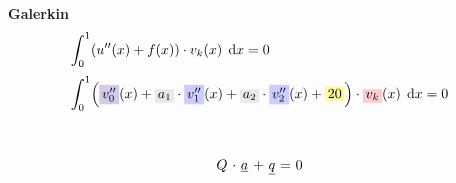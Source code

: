 \documentclass[
final,
a4paper,
oneside,
parskip=full,
headings=standardclasses,
headings=big,
pointednumbers,
fleqn
]{scrartcl}
\newcommand{\tfillb}[1]{\tfillc[#1][blue!20]}
\newcommand{\tfilly}[1]{\tfillc[#1][yellow!40]}
\newcommand{\tfillr}[1]{\tfillc[#1][red!20]}
\newcommand{\tfillv}[1]{\tfillc[#1][Violet!20]}
\newcommand{\tfillgr}[1]{\tfillc[#1][Gray!20]}
\newcommand*\difx{\; \mathop{}\!\mathrm{d}x}
\newcommand{\kl}[1]{{\left( #1 \right)}}
\begin{document}
    
    {\bf{Galerkin}} \\
    {\setlength{\abovedisplayskip}{-6pt}
    \setlength{\belowdisplayskip}{-12pt}
    \begin{align*}
        \int_{0}^{1}&{\kl{u''\kl{x} + f\kl{x}} \cdot v_k\kl{x} \difx} = 0  \\[0.1cm]
        \int_{0}^{1}&{\kl{\tfillv{$v_0''$}\kl{x}   + \tfillgr{$a_1$} \cdot \tfillb{$v_1''$}\kl{x}   + \tfillgr{$a_2$} \cdot \tfillb{$v_2''$}\kl{x} + \tfilly{$20$}} \cdot \tfillr{$v_k$}\kl{x} \difx} = 0  \\[0.1cm]
    \end{align*}} \\
    \begin{comment}
    \begin{bmatrix}
    \int\limits_{0}^{1}{\tfillb{$v_1''$}\kl{x} \cdot \tfillr{$v_1$}\kl{x} \difx} &
    \int\limits_{0}^{1}{\tfillb{$v_2''$}\kl{x} \cdot \tfillr{$v_1$}\kl{x} \difx} \\
    \int\limits_{0}^{1}{\tfillb{$v_1''$}\kl{x} \cdot \tfillr{$v_2$}\kl{x} \difx} & 
    \int\limits_{0}^{1}{\tfillb{$v_2''$}\kl{x} \cdot \tfillr{$v_2$}\kl{x} \difx} \\
    \end{bmatrix} & \cdot &
    \begin{pmatrix}
    a_1 \\
    a_2
    \end{pmatrix} & + & 
    \begin{pmatrix}
    \int\limits_{0}^{1}{\tfillv{$v_0''$}\kl{x} \cdot \tfillr{$v_1$}\kl{x} \difx} + \int\limits_{0}^{1}{\tfilly{$20$}\kl{x} \cdot \tfillr{$v_1$}\kl{x} \difx} \\
    \int\limits_{0}^{1}{\tfillv{$v_0''$}\kl{x} \cdot \tfillr{$v_1$}\kl{x} \difx} + \int\limits_{0}^{1}{\tfilly{$20$}\kl{x} \cdot \tfillr{$v_1$}\kl{x} \difx}
    \end{pmatrix} & = & 0
    \end{comment}
    {\setlength{\abovedisplayskip}{-6pt}
    \setlength{\belowdisplayskip}{-12pt}
    \begin{align*}
        \begin{array}{r@{\ }c@{\ }c@{\ }c@{\ }c@{\ }c@{\ }l}
            Q & \cdot & \uline{a} & + & \uline{q} & = & 0
        \end{array}
    \end{align*}} \\
\end{document}

